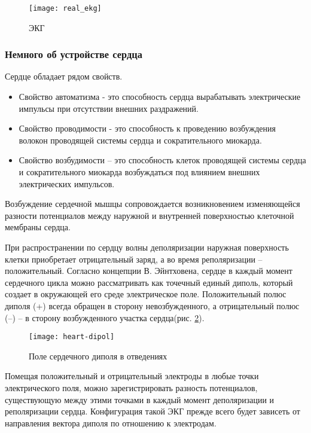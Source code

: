 \begin{figure}[h]
	\begin{center}
		\texttt{[image: real\_ekg]}
		\caption{ЭКГ}
		\label{ris:RR}
	\end{center}
\end{figure}
\subsubsection{Немного об устройстве сердца}

Сердце обладает рядом свойств.

\begin{itemize}
	\item Свойство автоматизма - это способность сердца вырабатывать электрические импульсы при отсутствии внешних раздражений.
	\item Свойство проводимости - это способность к проведению возбуждения волокон проводящей системы сердца и сократительного миокарда.
	\item Свойство возбудимости – это способность клеток проводящей системы сердца и сократительного миокарда возбуждаться под влиянием внешних электрических импульсов.
\end{itemize}

Возбуждение сердечной мышцы сопровождается возникновением изменяющейся разности потенциалов между наружной и внутренней поверхностью клеточной мембраны сердца.

При распространении по сердцу волны деполяризации наружная поверхность клетки приобретает отрицательный заряд, а во время реполяризации – положительный. Согласно концепции В. Эйнтховена, сердце в каждый момент сердечного цикла можно рассматривать как точечный единый диполь, который создает в окружающей его среде электрическое поле. Положительный полюс диполя (+) всегда обращен в сторону невозбужденного, а отрицательный полюс (–) – в сторону возбужденного участка сердца(рис. \ref{ris:dipol}).

\begin{figure}[h]
	\begin{center}
		\texttt{[image: heart-dipol]}
		\caption{Поле сердечного диполя в отведениях}
		\label{ris:dipol}
	\end{center}
\end{figure}


Помещая положительный и отрицательный электроды в любые точки электрического поля, можно зарегистрировать разность потенциалов, существующую между этими точками в каждый момент деполяризации и реполяризации сердца. Конфигурация такой ЭКГ прежде всего будет зависеть от направления вектора диполя по отношению к электродам.

